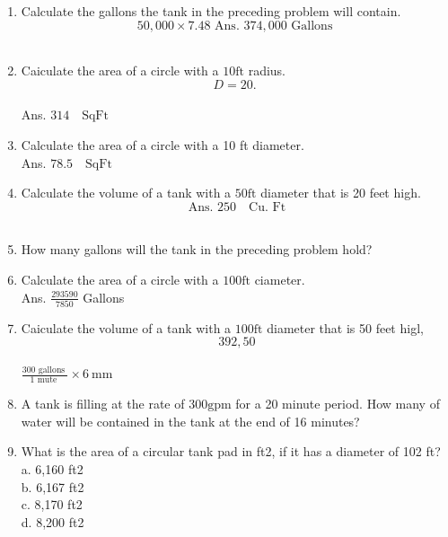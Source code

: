 \documentclass{article}
\begin{document}
\begin{enumerate}
\item Calculate the gallons the tank in the preceding problem will contain.\\
$$50,000 \times 7.48 \text { Ans. } 374,000 \text { Gallons }$$\\

\item Caiculate the area of a circle with a $10 \mathrm{ft}$ radius.\\
$$D=20 \text {. }$$\\
Ans. $314 \quad \mathrm{Sq} \mathrm{Ft}$\\

\item Calculate the area of a circle with a 10 ft diameter.\\
Ans. $78.5 \quad \mathrm{Sq} \mathrm{Ft}$\\

\item Calculate the volume of a tank with a $50 \mathrm{ft}$ diameter that is 20 feet high.\\
$$\text { Ans. } 250 \quad \mathrm{Cu} \text {. Ft }$$\\

\item How many gallons will the tank in the preceding problem hold?\\

\item Calculate the area of a circle with a $100 \mathrm{ft}$ ciameter.\\
Ans. $\frac{293590}{7850}$ Gallons\\

\item Caiculate the volume of a tank with a $100 \mathrm{ft}$ diameter that is 50 feet higl,\\
$$392,50$$\\
$\frac{300 \text { gallons }}{1 \text { mute }} \times 6 \mathrm{~mm}$\\

\item A tank is filling at the rate of $300 \mathrm{gpm}$ for a 20 minute period. How many of water will be contained in the tank at the end of 16 minutes?\\

\item What is the area of a circular tank pad in ft2, if it has a diameter of 102 ft?\\
a.	6,160 ft2\\
b.	6,167 ft2\\
c.	8,170 ft2\\
d.	8,200 ft2\\


\end{enumerate}
\end{document}
